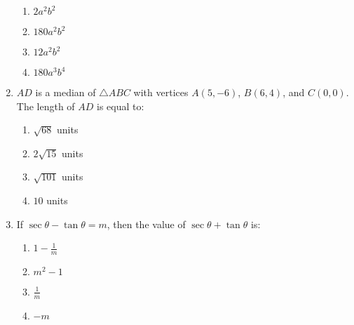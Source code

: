 \documentclass[12pt,-letter paper]{article}
\begin{document}
\begin{enumerate}
	\begin{enumerate}    
\item $2a^2 b^2$
    \item $180a^2 b^2$
    \item $12a^2  b^2$
    \item $180a^3 b^4$
	\end{enumerate}
\item $AD$ is a median of $\triangle ABC$ with vertices $A(5, -6)$, $B(6, 4)$, and $C(0, 0)$. The length of $AD$ is equal to:
	\begin{enumerate}    
\item $\sqrt{68}$ units
    \item $2\sqrt{15}$ units
    \item $\sqrt{101}$ units
    \item $10$ units
	\end{enumerate}
\item If $\sec\theta - \tan\theta = m$, then the value of $\sec\theta + \tan\theta$ is:
	\begin{enumerate}
\item ${1}-\frac{1}{m}$                                                       \item $m^2 - 1$
    \item $\frac{1}{m}$
    \item $-m$
	\end{enumerate}


\end{enumerate}
\end{document}
